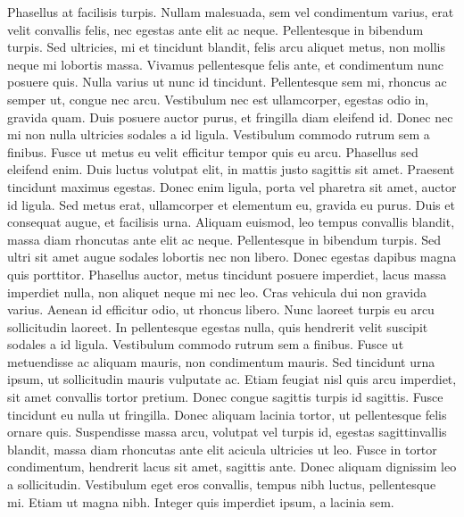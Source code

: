 \documentclass{article}
\newcounter{notes}
\newcommand{\notes}{\textbf{\thenotes}}
\begin{document}
{{ Phasellus at facilisis turpis. \notes
 Nullam malesuada, sem vel condimentum varius, erat velit convallis felis, nec egestas ante elit ac neque. \notes
 Pellentesque in bibendum turpis. \notes
 Sed ultricies, mi et tincidunt blandit, felis arcu aliquet metus, non mollis neque mi lobortis massa. \notes
 Vivamus pellentesque felis ante, et condimentum nunc posuere quis. \notes
 Nulla varius ut nunc id tincidunt. \notes
 Pellentesque sem mi, rhoncus ac semper ut, congue nec arcu. \notes
 Vestibulum nec est ullamcorper, egestas odio in, gravida quam. \notes
 Duis posuere auctor purus, et fringilla diam eleifend id. \notes
 Donec nec mi non nulla ultricies sodales a id ligula. \notes
 Vestibulum commodo rutrum sem a finibus. \notes
 Fusce ut metus eu velit efficitur tempor quis eu arcu. \notes
 Phasellus sed eleifend enim. \notes
 Duis luctus volutpat elit, in mattis justo sagittis sit amet. \notes
 Praesent tincidunt maximus egestas. \notes
 Donec enim ligula, porta vel pharetra sit amet, auctor id ligula. \notes
 Sed metus erat, ullamcorper et elementum eu, gravida eu purus. \notes
 Duis et consequat augue, et facilisis urna. \notes
 Aliquam euismod, leo tempus convallis blandit, massa diam rhoncutas ante elit ac neque. \notes
 Pellentesque in bibendum turpis. \notes
 Sed ultri sit amet augue sodales lobortis nec non libero. \notes
 Donec egestas dapibus magna quis porttitor. \notes
 Phasellus auctor, metus tincidunt posuere imperdiet, lacus massa imperdiet nulla, non aliquet neque mi nec leo. \notes
 Cras vehicula dui non gravida varius. \notes
 Aenean id efficitur odio, ut rhoncus libero. \notes
 Nunc laoreet turpis eu arcu sollicitudin laoreet. \notes
 In pellentesque egestas nulla, quis hendrerit velit suscipit sodales a id ligula. \notes
 Vestibulum commodo rutrum sem a finibus. \notes
 Fusce ut metuendisse ac aliquam mauris, non condimentum mauris. \notes
 Sed tincidunt urna ipsum, ut sollicitudin mauris vulputate ac. \notes
 Etiam feugiat nisl quis arcu imperdiet, sit amet convallis tortor pretium. \notes
 Donec congue sagittis turpis id sagittis. \notes
 Fusce tincidunt eu nulla ut fringilla. \notes
 Donec aliquam lacinia tortor, ut pellentesque felis ornare quis. \notes
 Suspendisse massa arcu, volutpat vel turpis id, egestas sagittinvallis blandit, massa diam rhoncutas ante elit acicula ultricies ut leo. \notes
 Fusce in tortor condimentum, hendrerit lacus sit amet, sagittis ante. \notes
 Donec aliquam dignissim leo a sollicitudin. \notes
 Vestibulum eget eros convallis, tempus nibh luctus, pellentesque mi. \notes
 Etiam ut magna nibh. \notes
 Integer quis imperdiet ipsum, a lacinia sem. \notes
}}
\end{document}
